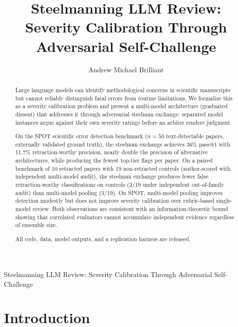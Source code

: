\documentclass{ws-ijprai}
\begin{document}
{Steelmanning LLM Review: Severity Calibration Through Adversarial Self-Challenge}

\title{Steelmanning LLM Review: Severity Calibration
Through Adversarial Self-Challenge}

\author{Andrew Michael Brilliant}
\address{Applied Dynamics Research, Sapporo, Japan\\
ORCID: 0009-0004-8024-5442\\
andrew.brilliant@gmail.com}

\maketitle

\begin{abstract}
Large language models can identify methodological concerns in scientific
manuscripts but cannot reliably distinguish fatal errors from routine
limitations. We formalize this as a severity calibration problem and
present a multi-model architecture (graduated dissent) that addresses it
through adversarial steelman exchange: separated model instances argue
against their own severity ratings before an arbiter renders judgment.

On the SPOT scientific error detection benchmark ($n=50$ text-detectable
papers, externally validated ground truth), the steelman exchange achieves
36\% pass@1 with 11.7\% retraction-worthy precision, nearly double the
precision of alternative architectures, while producing the fewest top-tier
flags per paper. On a paired benchmark of 10 retracted papers with 19
non-retracted controls (author-scored with independent multi-model audit),
the steelman exchange produces fewer false retraction-worthy classifications
on controls (2/19 under independent out-of-family audit) than multi-model
pooling (3/19). On SPOT, multi-model pooling improves detection modestly
but does not improve severity calibration over rubric-based single-model
review. Both observations are consistent with an information-theoretic
bound showing that correlated evaluators cannot accumulate independent
evidence regardless of ensemble size.

All code, data, model outputs, and a replication harness are released.
\end{abstract}



\section{Introduction}
\label{sec:intro}
\end{document}
